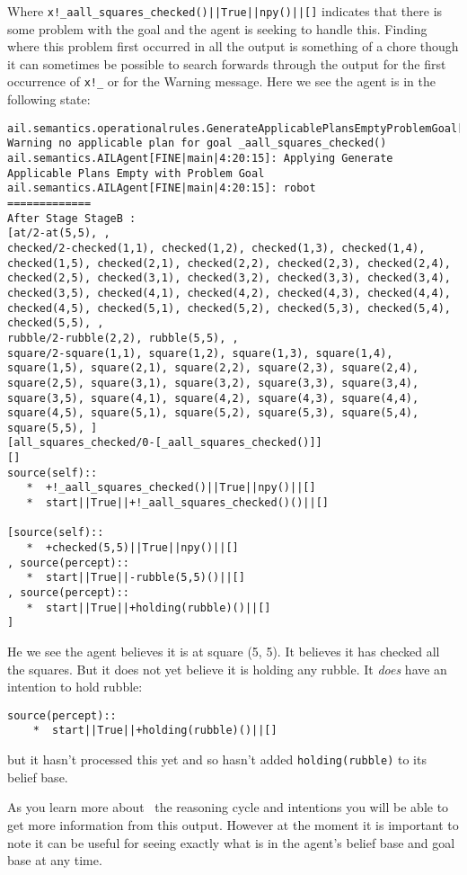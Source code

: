 Where \texttt{x!\_aall\_squares\_checked()||True||npy()||[]} indicates that there is some problem with the goal and the agent is seeking to handle this.  Finding where this problem first occurred in all the output is something of a chore though it can sometimes be possible to search forwards through the output for the first occurrence of \texttt{x!\_}  or for the Warning message.  Here we see the agent is in the following state:

\begin{verbatim}
ail.semantics.operationalrules.GenerateApplicablePlansEmptyProblemGoal[WARNING|main|4:20:15]: Warning no applicable plan for goal _aall_squares_checked() 
ail.semantics.AILAgent[FINE|main|4:20:15]: Applying Generate Applicable Plans Empty with Problem Goal 
ail.semantics.AILAgent[FINE|main|4:20:15]: robot
=============
After Stage StageB :
[at/2-at(5,5), , 
checked/2-checked(1,1), checked(1,2), checked(1,3), checked(1,4), checked(1,5), checked(2,1), checked(2,2), checked(2,3), checked(2,4), checked(2,5), checked(3,1), checked(3,2), checked(3,3), checked(3,4), checked(3,5), checked(4,1), checked(4,2), checked(4,3), checked(4,4), checked(4,5), checked(5,1), checked(5,2), checked(5,3), checked(5,4), checked(5,5), , 
rubble/2-rubble(2,2), rubble(5,5), , 
square/2-square(1,1), square(1,2), square(1,3), square(1,4), square(1,5), square(2,1), square(2,2), square(2,3), square(2,4), square(2,5), square(3,1), square(3,2), square(3,3), square(3,4), square(3,5), square(4,1), square(4,2), square(4,3), square(4,4), square(4,5), square(5,1), square(5,2), square(5,3), square(5,4), square(5,5), ]
[all_squares_checked/0-[_aall_squares_checked()]]
[]
source(self):: 
   *  +!_aall_squares_checked()||True||npy()||[]
   *  start||True||+!_aall_squares_checked()()||[]

[source(self):: 
   *  +checked(5,5)||True||npy()||[]
, source(percept):: 
   *  start||True||-rubble(5,5)()||[]
, source(percept):: 
   *  start||True||+holding(rubble)()||[]
] 
\end{verbatim}
He we see the agent believes it is at square (5, 5).  It believes it has checked all the squares.  But it does not yet believe it is holding any rubble.  It \emph{does} have an intention to hold rubble:
\begin{verbatim}
source(percept):: 
    *  start||True||+holding(rubble)()||[]
\end{verbatim}
but it hasn't processed this yet and so hasn't added \texttt{holding(rubble)} to its belief base.

As you learn more about \gwendolen\ the reasoning cycle and intentions you will be able to get more information from this output.  However at the moment it is important to note it can be useful for seeing exactly what is in the agent's belief base and goal base at any time.

